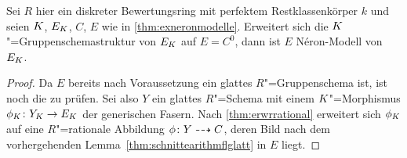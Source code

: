 \begin{Satz}\label{thm:fallstriktehenselisierung}
  Sei $R$ hier ein %
  diskreter Bewertungsring mit
  perfektem Restklassenkörper $k$
  und seien $K$, $E_{K}$, $C$, $E$ wie in \ref{thm:exneronmodelle}.
  Erweitert sich die $K$"=Gruppenschemastruktur von $E_{K}$ auf
  $E=C^0$, dann ist $E$ Néron-Modell von $E_{K}$.
  \begin{proof}
    Da $E$ bereits nach Voraussetzung ein glattes $R$"=Gruppenschema ist,
    ist noch die \NAbbEig zu prüfen.
    Sei also $Y$ ein glattes $R$"=Schema mit einem $K$"=Morphismus
    $\phi_{K}\colon Y_{K}\to E_{K}$ der generischen Fasern.
    Nach \ref{thm:erwrrational} erweitert sich $\phi_{K}$ auf eine
    $R$"=rationale Abbildung ${\phi\colon Y\dashrightarrow C}$, deren Bild nach dem
    vorhergehenden Lemma~\ref{thm:schnittearithmflglatt} in $E$
    liegt.
    

\end{proof}
\end{Satz}
